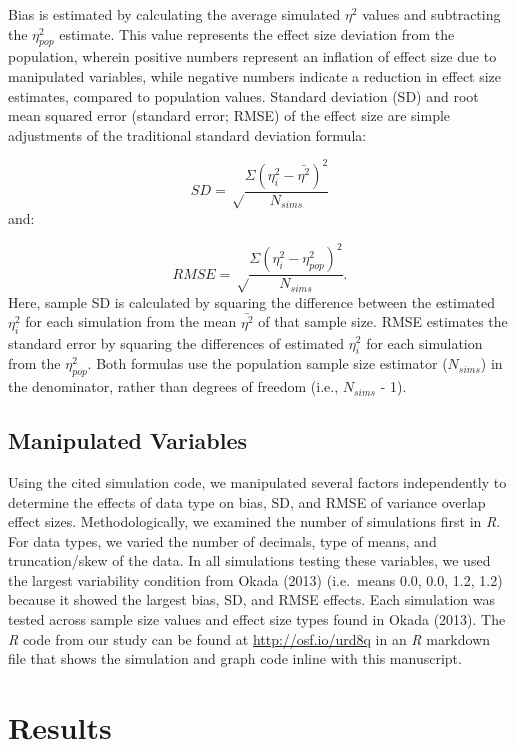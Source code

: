\documentclass[english,man]{apa6}
\theoremstyle{definition}
\theoremstyle{definition}
\theoremstyle{definition}
\theoremstyle{remark}
\begin{document}
Bias is estimated by calculating the average simulated \(\eta^2\) values
and subtracting the \(\eta^2_{pop}\) estimate. This value represents the
effect size deviation from the population, wherein positive numbers
represent an inflation of effect size due to manipulated variables,
while negative numbers indicate a reduction in effect size estimates,
compared to population values. Standard deviation (SD) and root mean
squared error (standard error; RMSE) of the effect size are simple
adjustments of the traditional standard deviation formula:

\[
SD = \sqrt\frac{\Sigma (\eta^2_{i} - \bar{\eta^2})^2} {N_{sims}}
\] and:

\[
RMSE = \sqrt\frac{\Sigma (\eta^2_{i} - \eta^2_{pop})^2} {N_{sims}}.
\] Here, sample SD is calculated by squaring the difference between the
estimated \(\eta^2_{i}\) for each simulation from the mean
\(\bar{\eta^2}\) of that sample size. RMSE estimates the standard error
by squaring the differences of estimated \(\eta^2_{i}\) for each
simulation from the \(\eta^2_{pop}\). Both formulas use the population
sample size estimator (\(N_{sims}\)) in the denominator, rather than
degrees of freedom (i.e., \(N_{sims}\) - 1).

\subsection{Manipulated Variables}\label{manipulated-variables}

Using the cited simulation code, we manipulated several factors
independently to determine the effects of data type on bias, SD, and
RMSE of variance overlap effect sizes. Methodologically, we examined the
number of simulations first in \emph{R}. For data types, we varied the
number of decimals, type of means, and truncation/skew of the data. In
all simulations testing these variables, we used the largest variability
condition from Okada (2013) (i.e.~means 0.0, 0.0, 1.2, 1.2) because it
showed the largest bias, SD, and RMSE effects. Each simulation was
tested across sample size values and effect size types found in Okada
(2013). The \emph{R} code from our study can be found at
\url{http://osf.io/urd8q} in an \emph{R} markdown file that shows the
simulation and graph code inline with this manuscript.

\section{Results}\label{results}
\end{document}
